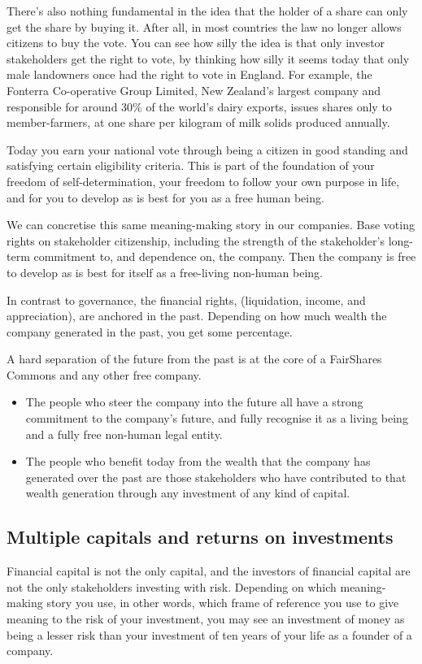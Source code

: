 There's also nothing fundamental in the idea that the holder of a share can only get the share by buying it. After all, in most countries the law no longer allows citizens to buy the vote. You can see how silly the idea is that only investor stakeholders get the right to vote, by thinking how silly it seems today that only male landowners once had the right to vote in England. For example, the Fonterra Co-operative Group Limited, New Zealand’s largest company and responsible for around 30\% of the world’s dairy exports, issues shares only to member-farmers, at one share per kilogram of milk solids produced annually.  


Today you earn your national vote through being a citizen in good standing and satisfying certain eligibility criteria. This is part of the foundation of your freedom of self-determination, your freedom to follow your own purpose in life, and for you to develop as is best for you as a free human being.


We can concretise this same meaning\hyp{}making story in our companies. Base voting rights on stakeholder citizenship, including the strength of the stakeholder's long-term commitment to, and dependence on, the company. Then the company is free to develop as is best for itself as a free-living non-human being.


In contrast to governance, the financial rights, (liquidation, income, and appreciation), are anchored in the past. Depending on how much wealth the company generated in the past, you get some percentage.


A hard separation of the future from the past is at the core of a FairShares Commons and any other free company. 


\begin{itemize}
\item The people who steer the company into the future all have a strong commitment to the company’s future, and fully recognise it as a living being and a fully free non-human legal entity. 
\item The people who benefit today from the wealth that the company has generated over the past are those stakeholders who have contributed to that wealth generation through any investment of any kind of capital.
\end{itemize}
\subsection{Multiple capitals and returns on investments}
Financial capital is not the only capital, and the investors of financial capital are not the only stakeholders investing with risk. Depending on which meaning\hyp{}making story you use, in other words, which frame of reference you use to give meaning to the risk of your investment, you may see an investment of money as being a lesser risk than your investment of ten years of your life as a founder of a company.


